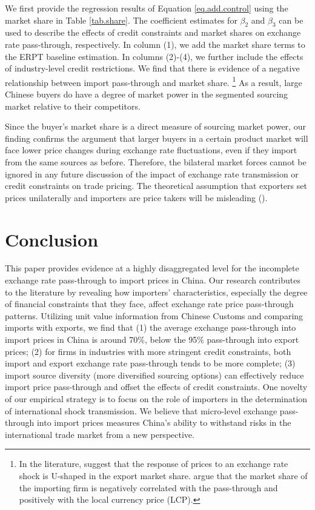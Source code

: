 We first provide the regression results of Equation \ref{eq.add.control} using the market share in Table \ref{tab.share}. The coefficient estimates for $\beta_2$ and $\beta_3$ can be used to describe the effects of credit constraints and market shares on exchange rate pass-through, respectively. In column (1), we add the market share terms to the ERPT baseline estimation. In columns (2)-(4), we further include the effects of industry-level credit restrictions. We find that there is evidence of a negative relationship between import pass-through and market share. \footnote{In the literature, \cite{auer2016} suggest that the response of prices to an exchange rate shock is U-shaped in the export market share. \cite{devereux2017} argue that the market share of the importing firm is negatively correlated with the pass-through and positively with the local currency price (LCP).} As a result, large Chinese buyers do have a degree of market power in the segmented sourcing market relative to their competitors.

Since the buyer's market share is a direct measure of sourcing market power, our finding confirms the argument that larger buyers in a certain product market will face lower price changes during exchange rate fluctuations, even if they import from the same sources as before. Therefore, the bilateral market forces cannot be ignored in any future discussion of the impact of exchange rate transmission or credit constraints on trade pricing. The theoretical assumption that exporters set prices unilaterally and importers are price takers will be misleading (\cite{alviarez2023}).

\section{Conclusion}\label{Conclusion}

This paper provides evidence at a highly disaggregated level for the incomplete exchange rate pass-through to import prices in China. Our research contributes to the literature by revealing how importers' characteristics, especially the degree of financial constraints that they face, affect exchange rate price pass-through patterns. Utilizing unit value information from Chinese Customs and comparing imports with exports, we find that (1) the average exchange pass-through into import prices in China is around 70\%, below the 95\% pass-through into export prices; (2) for firms in industries with more stringent credit constraints, both import and export exchange rate pass-through tends to be more complete; (3) import source diversity (more diversified sourcing options) can effectively reduce import price pass-through and offset the effects of credit constraints. One novelty of our empirical strategy is to focus on the role of importers in the determination of international shock transmission. We believe that micro-level exchange pass-through into import prices measures China's ability to withstand risks in the international trade market from a new perspective.

